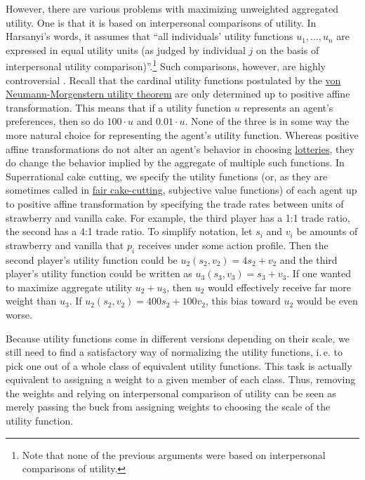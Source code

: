 However, there are various problems with maximizing unweighted
aggregated utility. One is that it is based on interpersonal comparisons
of utility. In Harsanyi's words, it assumes that ``all individuals'
utility functions \(u_{1},\dotsc,u_{n}\) are expressed in equal utility
units (as judged by individual \(j\) on the basis of interpersonal
utility comparison)''.\footnote{Note that none of the previous arguments
  were based on interpersonal comparisons of utility.} Such comparisons,
however, are highly controversial
\parencite{Hammond1991-rj,Binmore2007-da}. Recall that the
cardinal utility functions postulated by the
\href{https://en.wikipedia.org/wiki/Von_Neumann\%E2\%80\%93Morgenstern_utility_theorem}{von
Neumann-Morgenstern utility theorem} are only determined up to positive
affine transformation. This means that if a utility function \(u\)
represents an agent's preferences, then so do \(100 \cdot u\) and
\(0.01 \cdot u\). None of the three is in some way the more natural
choice for representing the agent's utility function. Whereas positive
affine transformations do not alter an agent's behavior in choosing
\href{https://en.wikipedia.org/wiki/Von_Neumann\%E2\%80\%93Morgenstern_utility_theorem\#Set-up}{lotteries},
they do change the behavior implied by the aggregate of multiple such
functions. In Superrational cake cutting, we specify the utility
functions (or, as they are sometimes called in
\href{https://en.wikipedia.org/wiki/Fair_cake-cutting}{fair
cake-cutting}, subjective value functions) of each agent up to positive
affine transformation by specifying the trade rates between units of
strawberry and vanilla cake. For example, the third player has a 1:1
trade ratio, the second has a 4:1 trade ratio. To simplify notation, let
\(s_{i}\) and \(v_{i}\) be amounts of strawberry and vanilla that
\(p_{i}\) receives under some action profile. Then the second player's
utility function could be \(u_{2}(s_{2},v_{2}) = 4s_{2} + v_{2}\) and the
third player's utility function could be written as
\(u_{3}(s_{3},v_{3}) = s_{3} + v_{3}\). If one wanted to maximize
aggregate utility \(u_{2} + u_{3}\), then \(u_{2}\) would effectively
receive far more weight than \(u_{3}\). If
\(u_{2}(s_{2},v_{2}) = 400s_{2} + 100v_{2}\), this bias toward \(u_{2}\)
would be even worse.

Because utility functions come in different versions depending on their
scale, we still need to find a satisfactory way of normalizing the
utility functions, i.\,e. to pick one out of a whole class of equivalent
utility functions. This task is actually equivalent to assigning a
weight to a given member of each class. Thus, removing the weights and
relying on interpersonal comparison of utility can be seen as merely
passing the buck from assigning weights to choosing the scale of the
utility function.

